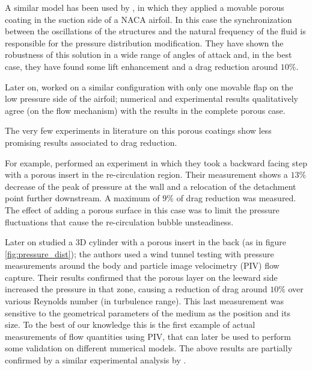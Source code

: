A similar model has been used by \citet{venkataraman2012numerical}, in which they applied a movable porous coating in the suction side of a NACA airfoil.
In this case the synchronization between the oscillations of the structures and the natural frequency of the fluid is responsible for the pressure distribution modification.
They have shown the robustness of this solution in a wide range of angles of attack and, in the best case, they have found some lift enhancement and a drag reduction around $10\%$.

Later on, \citet{rosti2017pelskin} worked on a similar configuration with only one movable flap on the low pressure side of the airfoil; numerical and experimental results qualitatively agree (on the flow mechanism) with the results in the complete porous case.


The very few experiments in literature on this porous coatings show less promising results associated to drag reduction.

For example, \citet{heenan1998passive} performed an experiment in which they took a backward facing step with a porous insert in the re-circulation region.
Their measurement shows a $13\%$ decrease of the peak of pressure at the wall and a relocation of the detachment point further downstream.
A maximum of $9\%$ of drag reduction was measured.
The effect of adding a porous surface in this case was to limit the pressure fluctuations that cause the re-circulation bubble unsteadiness.

Later on \citet{klausmann2017drag} studied a 3D cylinder with a porous insert in the back (as in figure \ref{fig:pressure_dist}); the authors used a wind tunnel testing with pressure measurements around the body and particle image velocimetry (PIV) flow capture.
Their results confirmed that the porous layer on the leeward side increased the pressure in that zone, causing a reduction of drag around $10\%$ over various Reynolds number (in turbulence range). This last measurement was sensitive to the geometrical parameters of the medium as the position and its size.
To the best of our knowledge this is the first example of actual measurements of flow quantities using PIV, that can later be used to perform some validation on different numerical models.
The above results are partially confirmed by a similar experimental analysis by \citet{grizzetti2015esperimenti}.

